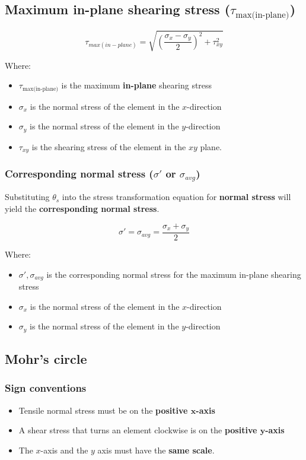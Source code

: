 \documentclass[11pt]{article}
\begin{document}
\newpage
\subsection{Maximum in-plane shearing stress (\(\tau_{\text{max(in-plane)}}\))}
\label{sec:org271be25}
\[\tau_{max(in-plane)} = \sqrt{\left( \frac{\sigma_x - \sigma_y}{2} \right)^2 + \tau_{xy}^2}\]

Where:
\begin{itemize}
\item \(\tau_{\text{max(in-plane)}}\) is the maximum \textbf{in-plane} shearing stress
\item \(\sigma_x\) is the normal stress of the element in the \(x\)-direction
\item \(\sigma_y\) is the normal stress of the element in the \(y\)-direction
\item \(\tau_{xy}\) is the shearing stress of the element in the \(xy\) plane.
\end{itemize}
\subsubsection{Corresponding normal stress (\(\sigma'\) or \(\sigma_{avg}\))}
\label{sec:org305ee97}
Substituting \(\theta_s\) into the stress transformation equation for \textbf{normal stress} will yield the \textbf{corresponding normal stress}.

\[\sigma' = \sigma_{avg} = \frac{\sigma_x + \sigma_y}{2}\]

Where:
\begin{itemize}
\item \(\sigma', \sigma_{avg}\) is the corresponding normal stress for the maximum in-plane shearing stress
\item \(\sigma_x\) is the normal stress of the element in the \(x\)-direction
\item \(\sigma_y\) is the normal stress of the element in the \(y\)-direction
\end{itemize}
\subsection{Mohr's circle}
\label{sec:org938007f}

\subsubsection{Sign conventions}
\label{sec:orga33f62a}
\begin{itemize}
\item Tensile normal stress must be on the \textbf{positive \(\boldsymbol{x}\)-axis}
\item A shear stress that turns an element clockwise is on the \textbf{positive \(\boldsymbol{y}\)-axis}
\item The \(x\)-axis and the \(y\) axis must have the \textbf{same scale}.
\end{itemize}
\end{document}
